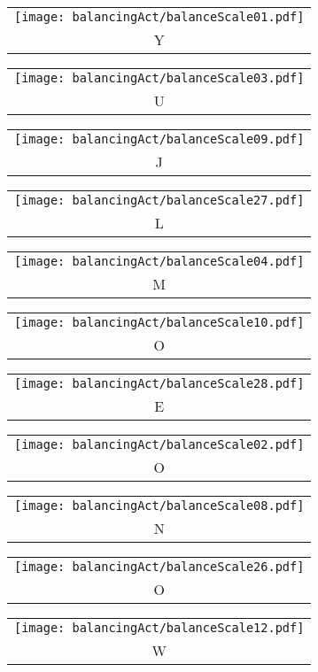 \begin{puzzle}
  \begin{center}
    \begin{tabular}{c}\texttt{[image: balancingAct/balanceScale01.pdf]}\\Y\end{tabular}
    \begin{tabular}{c}\texttt{[image: balancingAct/balanceScale03.pdf]}\\U\end{tabular}
    \begin{tabular}{c}\texttt{[image: balancingAct/balanceScale09.pdf]}\\J\end{tabular}
    \begin{tabular}{c}\texttt{[image: balancingAct/balanceScale27.pdf]}\\L\end{tabular}
  \end{center}
  \begin{center}
    \begin{tabular}{c}\texttt{[image: balancingAct/balanceScale04.pdf]}\\M\end{tabular}
    \begin{tabular}{c}\texttt{[image: balancingAct/balanceScale10.pdf]}\\O\end{tabular}
    \begin{tabular}{c}\texttt{[image: balancingAct/balanceScale28.pdf]}\\E\end{tabular}
    \begin{tabular}{c}\texttt{[image: balancingAct/balanceScale02.pdf]}\\O\end{tabular}
  \end{center}
  \begin{center}
    \begin{tabular}{c}\texttt{[image: balancingAct/balanceScale08.pdf]}\\N\end{tabular}
    \begin{tabular}{c}\texttt{[image: balancingAct/balanceScale26.pdf]}\\O\end{tabular}
    \begin{tabular}{c}\texttt{[image: balancingAct/balanceScale12.pdf]}\\W\end{tabular}

\end{center}
\end{puzzle}

